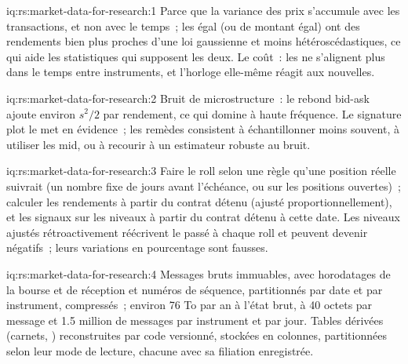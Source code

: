 \begin{solution}{iq:rs:market-data-for-research:1}
Parce que la variance des prix s'accumule avec les transactions, et non avec le temps~; les  égal (ou de montant égal) ont des rendements bien plus proches
d'une loi gaussienne et moins hétéroscédastiques, ce qui aide les statistiques qui supposent les deux. Le coût~: les  ne s'alignent plus dans le temps
entre instruments, et l'horloge elle-même réagit aux nouvelles.
\end{solution}

\begin{solution}{iq:rs:market-data-for-research:2}
Bruit de microstructure~: le rebond bid-ask ajoute environ $s^2/2$ par rendement, ce qui domine à haute fréquence. Le signature plot
le met en évidence~; les remèdes consistent à échantillonner moins souvent, à utiliser les mid, ou à recourir à un estimateur robuste au bruit.
\end{solution}

\begin{solution}{iq:rs:market-data-for-research:3}
Faire le roll selon une règle qu'une position réelle suivrait (un nombre fixe de jours avant l'échéance, ou sur les positions ouvertes)~; calculer les rendements à partir
du contrat détenu (ajusté proportionnellement), et les signaux sur les niveaux à partir du contrat détenu à cette date. Les niveaux ajustés rétroactivement réécrivent le
passé à chaque roll et peuvent devenir négatifs~; leurs variations en pourcentage sont fausses.
\end{solution}

\begin{solution}{iq:rs:market-data-for-research:4}
Messages bruts immuables, avec horodatages de la bourse et de réception et numéros de séquence, partitionnés par date et par instrument,
compressés~; environ 76 To par an à l'état brut, à 40 octets par message et 1.5 million de messages par instrument et par jour. Tables dérivées (carnets, ) reconstruites par
code versionné, stockées en colonnes, partitionnées selon leur mode de lecture, chacune avec sa filiation enregistrée.
\end{solution}

